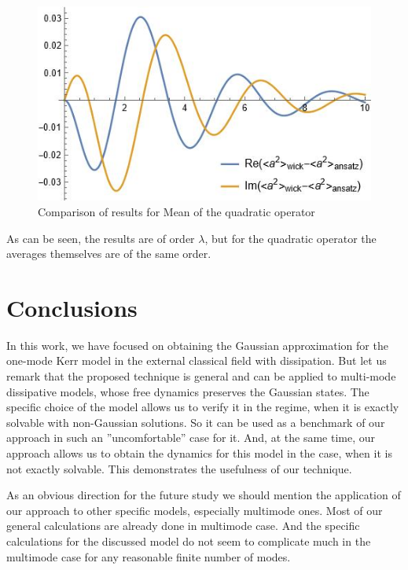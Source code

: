 \documentclass[12pt]{article}
\theoremstyle{definition}
\def\la {\lambda}
\begin{document}
\begin{figure}[h!]
\begin{center}
\begin{minipage}[h!]{0.45\linewidth}
				\includegraphics[width=1\linewidth]{Comparea2.JPG}
				\caption{Comparison of results for Mean of the quadratic operator}
				\label{fig:compa2}
			\end{minipage}
		\end{center}
	\end{figure}
	
	As can be seen, the results are of order $\la$, but for the quadratic operator the averages themselves are of the same order.
	
	
	\section{Conclusions}
	In this work, we have focused on obtaining the Gaussian approximation for the one-mode Kerr model in the external classical field with dissipation. But let us remark that the proposed technique is general and can be applied to multi-mode dissipative models, whose free dynamics preserves the Gaussian states. The specific choice of the model allows us to verify it in the regime, when it is exactly solvable with non-Gaussian solutions. So it can be used as a benchmark of our approach in such an ''uncomfortable'' case for it. And, at the same time, our approach allows us to obtain the dynamics for this model in the case, when it is not exactly solvable. This demonstrates the usefulness of our technique.
	
	As an obvious direction for the future study we should mention the application of our approach to other specific models, especially  multimode ones. Most of our general calculations are already done in multimode case. And the specific calculations for the discussed model do not seem to complicate much in the multimode case for any reasonable finite number of modes. 
	
\end{document}
